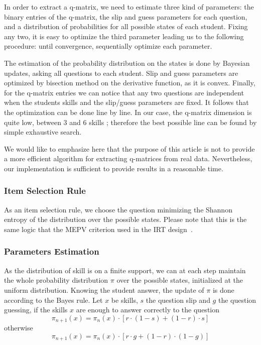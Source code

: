 \documentclass{sig-alternate}
\begin{document}
In order to extract a q-matrix, we need to estimate three kind of parameters: the binary entries of the q-matrix, the slip and guess parameters for each question, and a distribution of probabilities for all possible states of each student. Fixing any two, it is easy to optimize the third parameter leading us to the following procedure: until convergence, sequentially optimize each parameter.

The estimation of the probability distribution on the states is done by Bayesian updates, asking all questions to each student. Slip and guess parameters are optimized by bisection method on the derivative function, as it is convex. Finally, for the q-matrix entries we can notice that any two questions are independent when the students skills and the slip/guess parameters are fixed. It follows that the optimization can be done line by line. In our case, the q-matrix dimension is quite low, between 3 and 6 skills ; therefore the best possible line can be found by simple exhaustive search.

We would like to emphasize here that the purpose of this article is not to provide a more efficient algorithm for extracting q-matrices from real data. Nevertheless, our implementation is sufficient to provide results in a reasonable time. %

\subsubsection{Item Selection Rule}

As an item selection rule, we choose the question minimizing the Shannon entropy of the distribution over the possible states. Please note that this is the same logic that the MEPV criterion used in the IRT design~\citep{Cheng2009}.

\subsubsection{Parameters Estimation}

As the distribution of skill is on a finite support, we can at each step maintain the whole probability distribution $\pi$ over the possible states, initialized at the uniform distribution.
Knowing the student answer, the update of $\pi$ is done according to the Bayes rule. Let $x$ be skills, $s$ the question slip and $g$ the question guessing, if the skills $x$ are enough to answer correctly to the question
\[ \pi_{n+1}(x) = \pi_n(x) \cdot [r\cdot(1-s) + (1-r)\cdot s] \]
otherwise
\[ \pi_{n+1}(x) = \pi_n(x) \cdot [r\cdot g + (1-r)\cdot(1-g)] \]
\end{document}
